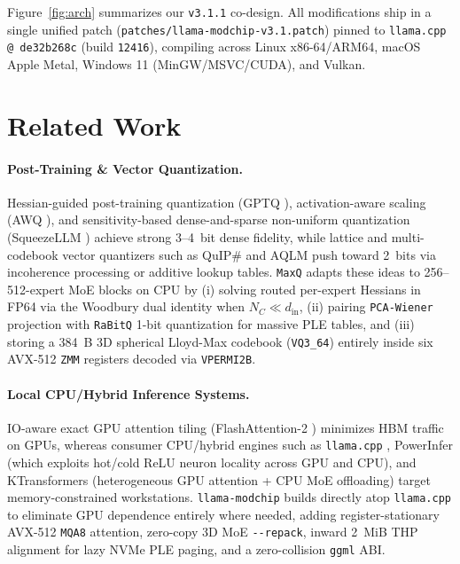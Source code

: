 \documentclass[10pt,twocolumn]{article}
\begin{document}
Figure~\ref{fig:arch} summarizes our \texttt{v3.1.1} co-design. All modifications ship in a single unified patch (\texttt{patches/llama-modchip-v3.1.patch}) pinned to \texttt{llama.cpp @ de32b268c} (build \texttt{12416}), compiling across Linux x86-64/ARM64, macOS Apple Metal, Windows 11 (MinGW/MSVC/CUDA), and Vulkan.

\section{Related Work}
\label{sec:related}

\paragraph{Post-Training \& Vector Quantization.}
Hessian-guided post-training quantization (GPTQ \cite{frantar2023gptq}), activation-aware scaling (AWQ \cite{lin2024awq}), and sensitivity-based dense-and-sparse non-uniform quantization (SqueezeLLM \cite{squeezellm}) achieve strong 3--4~bit dense fidelity, while lattice and multi-codebook vector quantizers such as QuIP\# \cite{tseng2024quip} and AQLM \cite{egiazarian2024aqlm} push toward 2~bits via incoherence processing or additive lookup tables. \texttt{MaxQ} adapts these ideas to 256--512-expert MoE blocks on CPU by (i) solving routed per-expert Hessians in FP64 via the Woodbury dual identity when $N_C \ll d_{\text{in}}$, (ii) pairing \texttt{PCA-Wiener} projection with \texttt{RaBitQ} \cite{rabitq2024} 1-bit quantization for massive PLE tables, and (iii) storing a 384~B 3D spherical Lloyd-Max codebook (\texttt{VQ3\_64}) entirely inside six AVX-512 \texttt{ZMM} registers decoded via \texttt{VPERMI2B}.

\paragraph{Local CPU/Hybrid Inference Systems.}
IO-aware exact GPU attention tiling (FlashAttention-2 \cite{dao2023flashattention2}) minimizes HBM traffic on GPUs, whereas consumer CPU/hybrid engines such as \texttt{llama.cpp} \cite{llamacpp}, PowerInfer \cite{powerinfer} (which exploits hot/cold ReLU neuron locality across GPU and CPU), and KTransformers \cite{ktransformers} (heterogeneous GPU attention + CPU MoE offloading) target memory-constrained workstations. \texttt{llama-modchip} builds directly atop \texttt{llama.cpp} to eliminate GPU dependence entirely where needed, adding register-stationary AVX-512 \texttt{MQA8} attention, zero-copy 3D MoE \texttt{{-}{-}repack}, inward 2~MiB THP alignment for lazy NVMe PLE paging, and a zero-collision \texttt{ggml} ABI.
\end{document}
